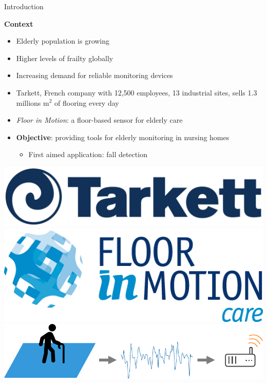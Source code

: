 \documentclass[8pt,t,aspectratio=1610]{beamer}
\newcommand{\myemph}[1]{\textcolor{myblue}{#1}}
\begin{document}
\begin{frame}{Introduction}
\begin{minipage}[t]{\linewidth}
    \begin{minipage}[t]{0.5\linewidth}
        \textbf{Context}
        \begin{itemize}
            \item Elderly population is growing
            \item Higher levels of frailty globally
            \item Increasing demand for reliable monitoring devices
            \item Tarkett, French company with 12,500 employees, 13 industrial sites, sells 1.3 millions m$^2$ of flooring every day
            \item \emph{Floor in Motion}: a floor-based sensor for elderly care
            \item \textbf{Objective}: providing tools for elderly monitoring in nursing homes
            \begin{itemize}
                \item First aimed application: fall detection
            \end{itemize}
        \end{itemize}
    \end{minipage}
    \begin{minipage}[t]{0.5\linewidth}
                \centering
                \vspace{1cm}
                \includegraphics[width=0.4\linewidth]{Tarkett-logo_red.jpg}\\[5pt]
                \includegraphics[width=0.4\linewidth]{FIM.jpg}\\[15pt]
                \includegraphics[width=0.95\linewidth]{schema_fall_detector.pdf}\\

\end{minipage}
\end{minipage}
\end{frame}
\end{document}
